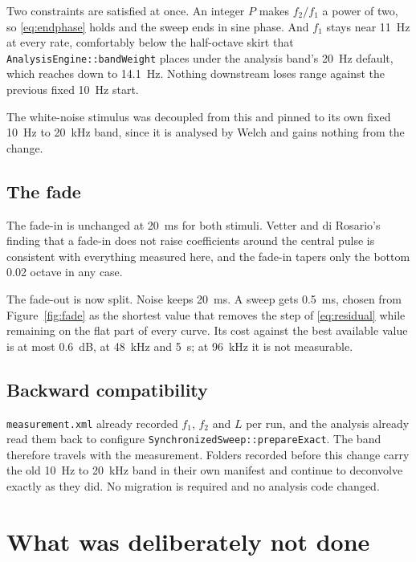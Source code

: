 \documentclass[11pt,a4paper]{article}
\newcommand{\code}[1]{\texttt{\small #1}}
\begin{document}
Two constraints are satisfied at once. An integer $P$ makes $f_2/f_1$ a power of
two, so \eqref{eq:endphase} holds and the sweep ends in sine phase. And $f_1$
stays near \SI{11}{\hertz} at every rate, comfortably below the half-octave
skirt that \code{AnalysisEngine::bandWeight} places under the analysis band's
\SI{20}{\hertz} default, which reaches down to \SI{14.1}{\hertz}. Nothing
downstream loses range against the previous fixed \SI{10}{\hertz} start.

The white-noise stimulus was decoupled from this and pinned to its own fixed
\SI{10}{\hertz} to \SI{20}{\kilo\hertz} band, since it is analysed by Welch and
gains nothing from the change.

\subsection{The fade}

The fade-in is unchanged at \SI{20}{\milli\second} for both stimuli. Vetter and
di Rosario's finding that a fade-in does not raise coefficients around the
central pulse is consistent with everything measured here, and the fade-in
tapers only the bottom \num{0.02} octave in any case.

The fade-out is now split. Noise keeps \SI{20}{\milli\second}. A sweep gets
\SI{0.5}{\milli\second}, chosen from Figure~\ref{fig:fade} as the shortest value
that removes the step of \eqref{eq:residual} while remaining on the flat part of
every curve. Its cost against the best available value is at most
\SI{0.6}{\dB}, at \SI{48}{\kilo\hertz} and \SI{5}{\second}; at
\SI{96}{\kilo\hertz} it is not measurable.

\subsection{Backward compatibility}

\code{measurement.xml} already recorded $f_1$, $f_2$ and $L$ per run, and the
analysis already read them back to configure
\code{SynchronizedSweep::prepareExact}. The band therefore travels with the
measurement. Folders recorded before this change carry the old
\SI{10}{\hertz} to \SI{20}{\kilo\hertz} band in their own manifest and continue
to deconvolve exactly as they did. No migration is required and no analysis code
changed.

\section{What was deliberately not done}
\label{sec:notdone}
\end{document}
